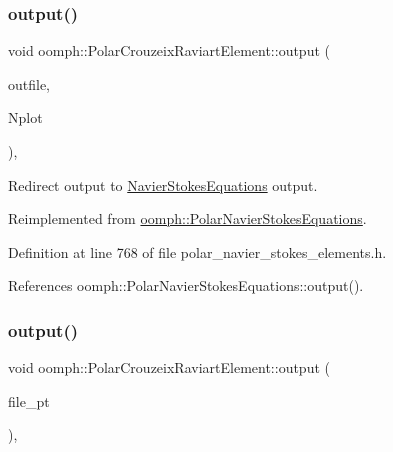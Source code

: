 \subsubsection{\texorpdfstring{output()}{output()}\hspace{0.1cm}{\footnotesize\ttfamily [2/4]}}
{\footnotesize\ttfamily void oomph\+::\+Polar\+Crouzeix\+Raviart\+Element\+::output (\begin{DoxyParamCaption}\item[{std\+::ostream \&}]{outfile,  }\item[{const unsigned \&}]{Nplot }\end{DoxyParamCaption})\hspace{0.3cm}{\ttfamily [inline]}, {\ttfamily [virtual]}}



Redirect output to \hyperlink{classoomph_1_1NavierStokesEquations}{Navier\+Stokes\+Equations} output. 



Reimplemented from \hyperlink{classoomph_1_1PolarNavierStokesEquations_a830bb7a0fc6532994fd1e173f7803d54}{oomph\+::\+Polar\+Navier\+Stokes\+Equations}.



Definition at line 768 of file polar\+\_\+navier\+\_\+stokes\+\_\+elements.\+h.



References oomph\+::\+Polar\+Navier\+Stokes\+Equations\+::output().

\mbox{\label{classoomph_1_1PolarCrouzeixRaviartElement_a3ebab0f1e7981aaab9100fcaa39cd7a4}} 
\subsubsection{\texorpdfstring{output()}{output()}\hspace{0.1cm}{\footnotesize\ttfamily [3/4]}}
{\footnotesize\ttfamily void oomph\+::\+Polar\+Crouzeix\+Raviart\+Element\+::output (\begin{DoxyParamCaption}\item[{F\+I\+LE $\ast$}]{file\+\_\+pt }\end{DoxyParamCaption})\hspace{0.3cm}{\ttfamily [inline]}, {\ttfamily [virtual]}}



